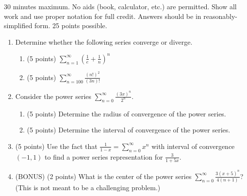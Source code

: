 \documentclass[12pt]{article}
\newcommand{\ds}{\displaystyle}
\begin{document}
30 minutes maximum.  No aids (book, calculator, etc.) are permitted.
Show all work and use proper notation for full credit.  Answers should
be in reasonably-simplified form.  25 points possible.

\begin{enumerate}

\item Determine whether the following series converge or diverge.
  \begin{enumerate}
  \item (5 points) $\ds \sum_{n=1}^{\infty} \left( \frac{1}{e} + \frac{1}{n} \right)^n$
    \vfill
    
  \item (5 points) $\ds \sum_{n=100}^{\infty} \frac{(n!)^2}{(3n)!}$
    \vfill
    
  \end{enumerate}

  \newpage


\item Consider the power series
  $\ds \sum_{n=0}^{\infty} \frac{(3x)^n}{2^n}$.
  \begin{enumerate}
  \item (5 points) Determine the radius of convergence of the power series.
    \vfill
    
  \item (5 points) Determine the interval of convergence of the power series.
    \vfill
  \end{enumerate}

  \newpage

\item (5 points) Use the fact that
  $\ds \frac{1}{1-x} = \sum_{n=0}^{\infty} x^n$ with interval of
  convergence $(-1,1)$ to find a power series representation for
  $\ds \frac{3}{1+5x}$.

  \vfill

\item (BONUS) (2 points) What is the center of the power series
  $\ds \sum_{n=0}^{\infty} \frac{3(x+5)^n}{4(n+1)}$? (This is not meant to
  be a challenging problem.)

  \vspace{2cm}
  

\end{enumerate}
\end{document}
